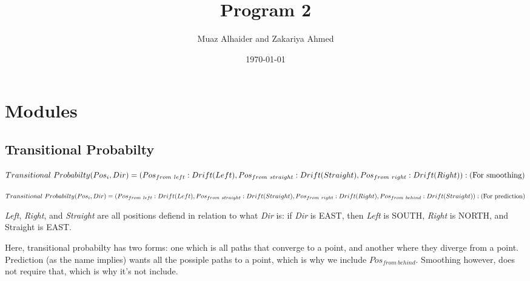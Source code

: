 \documentclass[11pt]{article}
\author{Muaz Alhaider and Zakariya Ahmed}
\date{\today}
\title{Program 2}
\begin{document}
\maketitle
\tableofcontents


\section{Modules}
\label{sec:org66fd117}

\subsection{Transitional Probabilty}
\label{sec:org324d76c}
   \begin{math}
    Transitional\ Probabilty(Pos_i, Dir) = \\
     (Pos_{from\ left}:Drift(Left), Pos_{from\ straight}:Drift(Straight), Pos_{from\ right}:Drift(Right)): (\text{For smoothing})
\end{math}

\newline 
\begin{math}
\\ \\
Transitional\ Probabilty(Pos_i, Dir) =\\ (Pos_{from\ left}:Drift(Left), Pos_{from\ straight}:Drift(Straight), Pos_{from\ right}:Drift(Right), Pos_{from\ behind}:Drift(Straight)): (\text{For prediction})
\\ \\
\end{math}


\emph{Left}, \emph{Right}, and \emph{Straight} are all positions defiend in relation to what \emph{Dir} is: if \emph{Dir} is EAST, then \emph{Left} is SOUTH, \emph{Right} is NORTH, and Straight is EAST.

Here, transitional probabilty has two forms: one which is all paths that converge to a point, and another where they diverge from a point. Prediction (as the name implies) wants all the possiple paths to a point, which is why we include \(Pos_{from\ behind}\). Smoothing however, does not require that, which is why it's not include.
\end{document}
